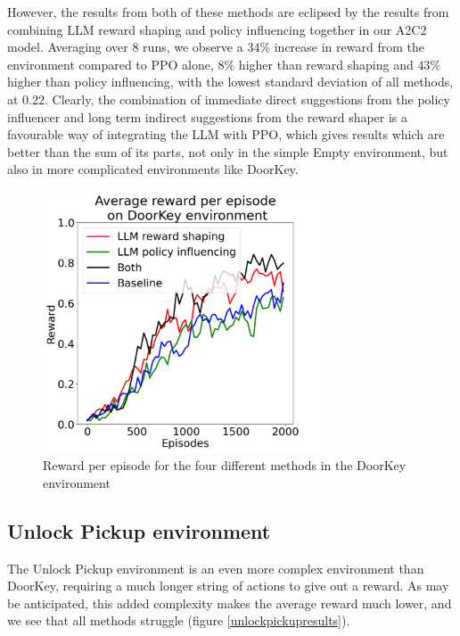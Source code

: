 \documentclass[conference]{IEEEtran}
\begin{document}
However, the results from both of these methods are eclipsed by the results from combining LLM reward shaping and policy influencing together in our A2C2 model. Averaging over 8 runs, we observe a $34\%$ increase in reward from the environment compared to PPO alone, $8\%$ higher than reward shaping and $43\%$ higher than policy influencing, with the lowest standard deviation of all methods, at $0.22$. Clearly, the combination of immediate direct suggestions from the policy influencer and long term indirect suggestions from the reward shaper is a favourable way of integrating the LLM with PPO, which gives results which are better than the sum of its parts, not only in the simple Empty environment, but also in more complicated environments like DoorKey.

\begin{figure}[h]
\centerline{\includegraphics[width=3.25in]{figure/doorkeyresults.png}}
\caption{Reward per episode for the four different methods in the DoorKey environment}
\label{doorkeyresults}
\end{figure}

\subsection{Unlock Pickup environment}

The Unlock Pickup environment is an even more complex environment than DoorKey, requiring a much longer string of actions to give out a reward. As may be anticipated, this added complexity makes the average reward much lower, and we see that all methods struggle (figure \ref{unlockpickupresults}).
\end{document}
